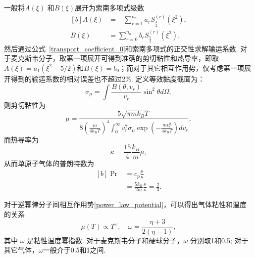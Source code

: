 一般将$A(\xi)$ 和$B(\xi)$展开为索南多项式级数
\begin{equation}\label{sonine_expansion}
\begin{aligned}[b]
A(\xi)&=-\sum_{r=1}^{n_a}a_rS^{(r)}_{\frac{3}{2}}(\xi^2), \\
B(\xi)&=\sum_{r=0}^{n_b}b_rS^{(r)}_{\frac{5}{2}}(\xi^2),
\end{aligned}
\end{equation}
然后通过公式~\eqref{transport_coefficient_0}和索南多项式的正交性求解输运系数. 对于麦克斯韦分子，取第一项展开可得到准确的剪切粘性和热导率，即取$A(\xi)=a_1(\xi^2-5/2)$和$B(\xi)=b_0$；而对于其它相互作用势，仅考虑第一项展开得到的输运系数的相对误差也不超过2\%. 定义等效黏度截面为：
\begin{equation}
\sigma_{\mu}=\int \frac{B(\theta,v_r)}{v_r}\sin^2\theta {d\Omega},
\end{equation}
则剪切粘性为
\begin{equation}\label{shear_CE_viscosity0}
\mu=\frac{5\sqrt{\pi{m}k_BT}}{8\left(\frac{m}{4k_BT}\right)^4\int_0^\infty
	{}v_r^7\sigma_{\mu}\exp\left(-\frac{mv^2_r}{4k_BT}\right)dv_r},
\end{equation}
而热导率为
\begin{equation}\label{shear_CE_thermal0}
{\kappa}=\frac{15}{4}\frac{k_B}{m}\mu,
\end{equation}
从而单原子气体的普朗特数为
\begin{equation}\label{Prandtl_number}
\begin{aligned}[b]
\Pr&={c_p}\frac{\mu}{\kappa}\\
&=\frac{5k_B}{2m}\frac{\mu}{\kappa}=\frac{2}{3}.
\end{aligned}
\end{equation}

对于逆幂律分子间相互作用势\eqref{power_law_potential}，可以得出气体粘性和温度的关系
\begin{equation}\label{temperature_dependence}
\mu(T)\propto{T^\omega}, \quad
\omega=\frac{\eta+3}{2(\eta-1)},
\end{equation}
其中 $\omega$ 是粘性温度幂指数. 对于麦克斯韦分子和硬球分子，$\omega$ 分别取1和0.5; 对于其它气体，$\omega$一般介于0.5和1之间. 



